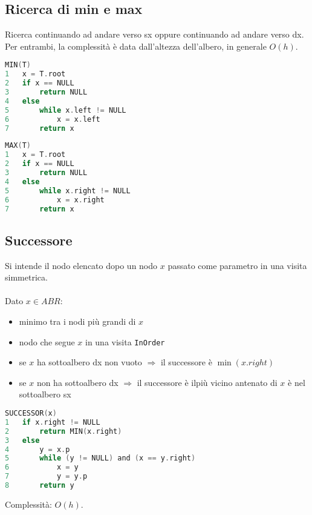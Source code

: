 \subsection{Ricerca di min e max}
Ricerca continuando ad andare verso sx oppure continuando ad andare verso dx. Per entrambi, la complessità è data dall'altezza dell'albero, in generale $O(h)$.
\begin{multicols}{2}
\begin{mdframed}
\begin{lstlisting}[language=C]
MIN(T)
1   x = T.root
2   if x == NULL
3       return NULL
4   else
5       while x.left != NULL
6           x = x.left
7       return x
\end{lstlisting}
\end{mdframed}
\begin{mdframed}
\begin{lstlisting}[language=C]
MAX(T)
1   x = T.root
2   if x == NULL
3       return NULL
4   else
5       while x.right != NULL
6           x = x.right
7       return x
\end{lstlisting}
\end{mdframed}
\end{multicols}

\newpage
\subsection{Successore}
Si intende il nodo elencato dopo un nodo $x$ passato come parametro in una visita simmetrica. \\~\\
Dato $x \in ABR$:
\begin{itemize}
    \item minimo tra i nodi più grandi di $x$
    \item nodo che segue $x$ in una visita \verb|InOrder|
    \item se $x$ ha sottoalbero dx non vuoto $\Rightarrow$ il successore è $\min(x.right)$
    \item se $x$ non ha sottoalbero dx $\Rightarrow$ il successore è ilpiù vicino antenato di $x$ è nel sottoalbero sx
\end{itemize}
\begin{mdframed}
\begin{lstlisting}[language=C]
SUCCESSOR(x)
1   if x.right != NULL
2       return MIN(x.right)
3   else
4       y = x.p
5       while (y != NULL) and (x == y.right)
6           x = y
7           y = y.p
8       return y
\end{lstlisting}
\end{mdframed}
Complessità: $O(h)$.
